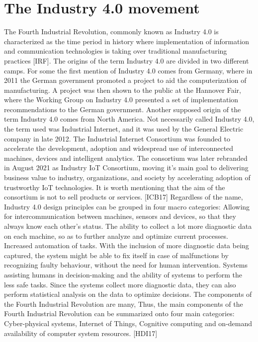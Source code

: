 \documentclass[a4paper, 12pt]{book}
\begin{document}
\section{The Industry 4.0 movement}
The Fourth Industrial Revolution, commonly known as Industry 4.0 is characterized as the time period in history where implementation of information and communication technologies is taking over traditional manufacturing practices [IRF].
The origins of the term Industry 4.0 are divided in two different camps. For some the first mention of Industry 4.0 comes from Germany, where in 2011 the German government promoted a project to aid the computerization of manufacturing. A project was then shown to the public at the Hannover Fair, where the Working Group on Industry 4.0 presented a set of implementation recommendations to the German government. Another supposed origin of the term Industry 4.0 comes from North America. Not necessarily called Industry 4.0, the term used was Industrial Internet, and it was used by the General Electric company in late 2012. The Industrial Internet Consortium was founded to accelerate the development, adoption and widespread use of interconnected machines, devices and intelligent analytics. The consortium was later rebranded in August 2021 as Industry IoT Consortium, moving it’s main goal to delivering business value to industry, organizations, and society by accelerating adoption of trustworthy IoT technologies. It is worth mentioning that the aim of the consortium is not to sell products or services. [ICB17]
Regardless of the name, Industry 4.0 design principles can be grouped in four macro categories:
Allowing for intercommunication between machines, sensors and devices, so that they always know each other’s status.
The ability to collect a lot more diagnostic data on each machine, so as to further analyze and optimize current processes.
Increased automation of tasks. With the inclusion of more diagnostic data being captured, the system might be able to fix itself in case of malfunctions by recognizing faulty behaviour, without the need for human intervention.
Systems assisting humans in decision-making and the ability of systems to perform the less safe tasks. Since the systems collect more diagnostic data, they can also perform statistical analysis on the data to optimize decisions.
The components of the Fourth Industrial Revolution are many,
Thus, the main components of the Fourth Industrial Revolution can be summarized onto four main categories: Cyber-physical systems, Internet of Things, Cognitive computing and on-demand availability of computer system resources. [HDI17]
\end{document}
